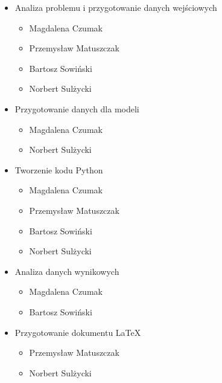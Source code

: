 \documentclass[]{article}
\begin{document}
\begin{itemize}
	\item Analiza problemu i przygotowanie danych wejściowych 
	\begin{itemize}
		\item Magdalena Czumak 
		\item Przemysław Matuszczak		
		\item Bartosz Sowiński
		\item Norbert Sulżycki
	\end{itemize}
	\item Przygotowanie danych dla modeli 
	\begin{itemize}
		\item Magdalena Czumak 
		\item Norbert Sulżycki
	\end{itemize}
	\item Tworzenie kodu Python
	\begin{itemize}
		\item Magdalena Czumak 
		\item Przemysław Matuszczak		
		\item Bartosz Sowiński
		\item Norbert Sulżycki
	\end{itemize}
	\item Analiza danych wynikowych
	\begin{itemize}
		\item Magdalena Czumak 
		\item Bartosz Sowiński
	\end{itemize}
	\item Przygotowanie dokumentu LaTeX
	\begin{itemize}
		\item Przemysław Matuszczak		
		\item Norbert Sulżycki
	\end{itemize}
\end{itemize}
\end{document}
